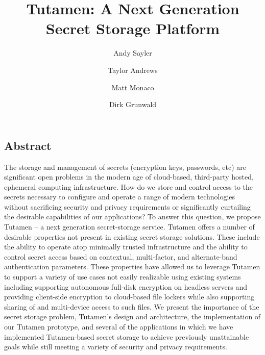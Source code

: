 \documentclass[letterpaper,twocolumn,10pt]{article}
\begin{document}
\date{}

\title{\Large \bf Tutamen: A Next Generation Secret Storage Platform}

\author{Andy Sayler}
\author{Taylor Andrews}
\author{Matt Monaco}
\author{Dirk Grunwald}

\maketitle


\subsection*{Abstract}

The storage and management of secrets (encryption keys, passwords,
etc) are significant open problems in the modern age of cloud-based,
third-party hosted, ephemeral computing infrastructure. How do we
store and control access to the secrets necessary to configure and
operate a range of modern technologies without sacrificing security
and privacy requirements or significantly curtailing the desirable
capabilities of our applications? To answer this question, we propose
Tutamen -- a next generation secret-storage service. Tutamen offers a
number of desirable properties not present in existing secret storage
solutions. These include the ability to operate atop minimally trusted
infrastructure and the ability to control secret access based on
contextual, multi-factor, and alternate-band authentication
parameters. These properties have allowed us to leverage Tutamen to
support a variety of use cases not easily realizable using existing
systems including supporting autonomous full-disk encryption on
headless servers and providing client-side encryption to cloud-based
file lockers while also supporting sharing of and multi-device access
to such files. We present the importance of the secret storage
problem, Tutamen's design and architecture, the implementation of our
Tutamen prototype, and several of the applications in which we have
implemented Tutamen-based secret storage to achieve previously
unattainable goals while still meeting a variety of security and
privacy requirements.








{
  \footnotesize
  
  
}
\end{document}
